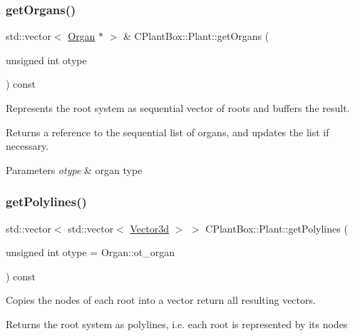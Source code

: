 \subsubsection{\texorpdfstring{get\+Organs()}{getOrgans()}}
{\footnotesize\ttfamily std\+::vector$<$ \hyperlink{classCPlantBox_1_1Organ}{Organ} $\ast$ $>$ \& C\+Plant\+Box\+::\+Plant\+::get\+Organs (\begin{DoxyParamCaption}\item[{unsigned int}]{otype }\end{DoxyParamCaption}) const}



Represents the root system as sequential vector of roots and buffers the result. 

Returns a reference to the sequential list of organs, and updates the list if necessary.


\begin{DoxyParams}{Parameters}
{\em otype} & organ type \\
\hline
\end{DoxyParams}
\mbox{\label{classCPlantBox_1_1Plant_a9b14671b9c42aff5f57dd7cf62c3c78f}} 
\subsubsection{\texorpdfstring{get\+Polylines()}{getPolylines()}}
{\footnotesize\ttfamily std\+::vector$<$ std\+::vector$<$ \hyperlink{classCPlantBox_1_1Vector3d}{Vector3d} $>$ $>$ C\+Plant\+Box\+::\+Plant\+::get\+Polylines (\begin{DoxyParamCaption}\item[{unsigned int}]{otype = {\ttfamily Organ\+:\+:ot\+\_\+organ} }\end{DoxyParamCaption}) const}



Copies the nodes of each root into a vector return all resulting vectors. 

Returns the root system as polylines, i.\+e. each root is represented by its nodes \mbox{\label{classCPlantBox_1_1Plant_ac907fcec0c28302d76b77b943dac7963}} 
